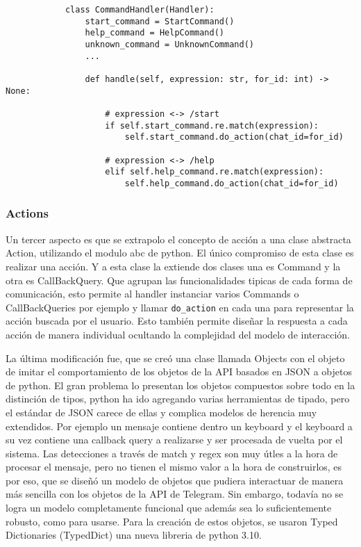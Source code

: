         \begin{verbatim}
            class CommandHandler(Handler):
                start_command = StartCommand()
                help_command = HelpCommand()
                unknown_command = UnknownCommand()
                ...

                def handle(self, expression: str, for_id: int) -> None:

                    # expression <-> /start
                    if self.start_command.re.match(expression):
                        self.start_command.do_action(chat_id=for_id)

                    # expression <-> /help
                    elif self.help_command.re.match(expression):
                        self.help_command.do_action(chat_id=for_id)
        \end{verbatim}

    \subsubsection{Actions}
        \par Un tercer aspecto es que se extrapolo el concepto de acción a una clase abstracta Action, utilizando el modulo abc de python. El único compromiso de esta clase es realizar una acción. Y a esta clase la extiende dos clases una es Command y la otra es CallBackQuery. Que agrupan las funcionalidades tipicas de cada forma de comunicación, esto permite al handler instanciar varios Commands o CallBackQueries por ejemplo y llamar  \texttt{do_action} en cada una para representar la acción buscada por el usuario.
        Esto también permite diseñar la respuesta a cada acción de manera individual ocultando la complejidad del modelo de interacción.


        \par La última modificación fue, que se creó una clase llamada Objects con el objeto de imitar el comportamiento de los objetos de la API basados en JSON a objetos de python. El gran problema lo presentan los objetos compuestos sobre todo en la distinción de tipos, python ha ido agregando varias herramientas de tipado, pero el estándar de JSON carece de ellas y complica modelos de herencia muy extendidos. Por ejemplo un mensaje contiene dentro un keyboard y el keyboard a su vez contiene una callback query a realizarse y ser procesada de vuelta por el sistema. Las detecciones a través de match y regex son muy útles a la hora de procesar el mensaje, pero no tienen el mismo valor a la hora de construirlos, es por eso, que se diseñó un modelo de objetos que pudiera interactuar de manera más sencilla con los objetos de la API de Telegram. Sin embargo, todavía no se logra un modelo completamente funcional que además sea lo suficientemente robusto, como para usarse. Para la creación de estos objetos, se usaron Typed Dictionaries (TypedDict) una nueva libreria de python 3.10.

